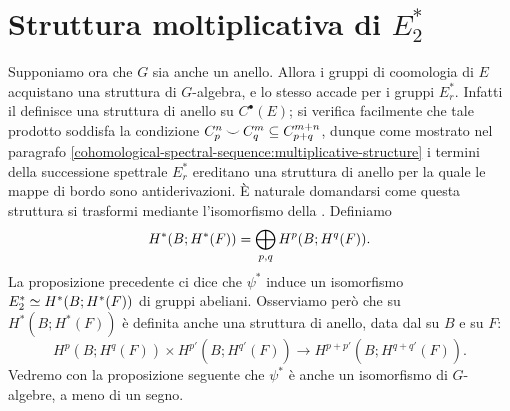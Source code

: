 \section{Struttura moltiplicativa di \texorpdfstring{$E^*_2$}{E*2}}
Supponiamo ora che $G$ sia anche un anello. Allora i gruppi di coomologia di $E$ acquistano una struttura di $G$-algebra, e lo stesso accade per i gruppi $E^\ast_r$. Infatti il \cupproduct{} definisce una struttura di anello su $C^\bullet(E)$; si verifica facilmente che tale prodotto soddisfa la condizione $C^n_p\mathbin{\smile} C^m_q\subseteq C^{m+n}_{p+q}$, dunque come mostrato nel paragrafo \ref{cohomological-spectral-sequence:multiplicative-structure} i termini della successione spettrale $E^\ast_r$ ereditano una struttura di anello per la quale le mappe di bordo sono antiderivazioni. È naturale domandarsi come questa struttura si trasformi mediante l'isomorfismo della .
Definiamo
$$
H^*(B;H^*(F))=\bigoplus_{p,q}H^p(B;H^q(F)).
$$
La proposizione precedente ci dice che $\psi^*$ induce un isomorfismo $E^\ast_2\simeq H^*(B;H^*(F))$ di gruppi abeliani.
Osserviamo però che su $H^*(B;H^*(F))$ è definita anche una struttura di anello, data dal \cupproduct{} su $B$ e su $F$:
$$
H^p(B;H^q(F))\times H^{p'}(B;H^{q'}(F))\longrightarrow H^{p+p'}(B;H^{q+q'}(F)).
$$
Vedremo con la proposizione seguente che $\psi^*$ è anche un isomorfismo di $G$-algebre, a meno di un segno.

